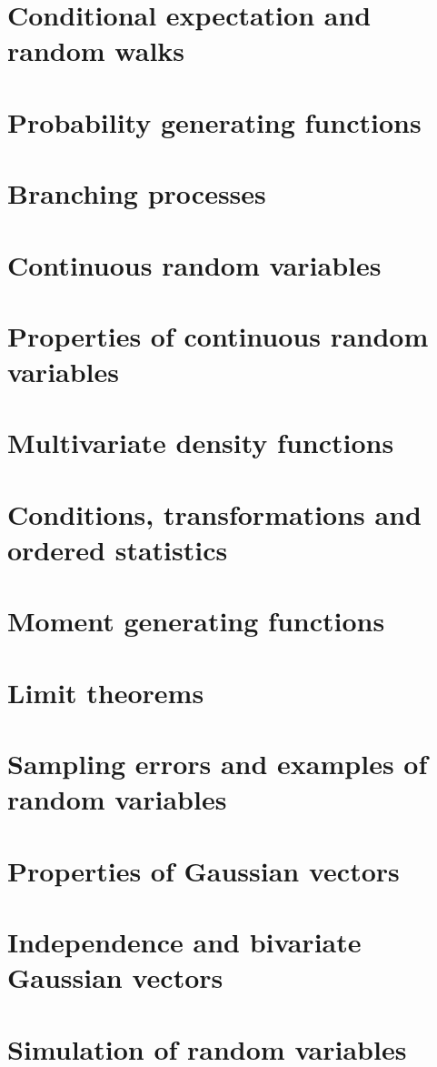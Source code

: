\documentclass{article}
\begin{document}
\section{Conditional expectation and random walks}

\section{Probability generating functions}

\section{Branching processes}

\section{Continuous random variables}

\section{Properties of continuous random variables}

\section{Multivariate density functions}

\section{Conditions, transformations and ordered statistics}

\section{Moment generating functions}

\section{Limit theorems}

\section{Sampling errors and examples of random variables}

\section{Properties of Gaussian vectors}

\section{Independence and bivariate Gaussian vectors}

\section{Simulation of random variables}

\end{document}
